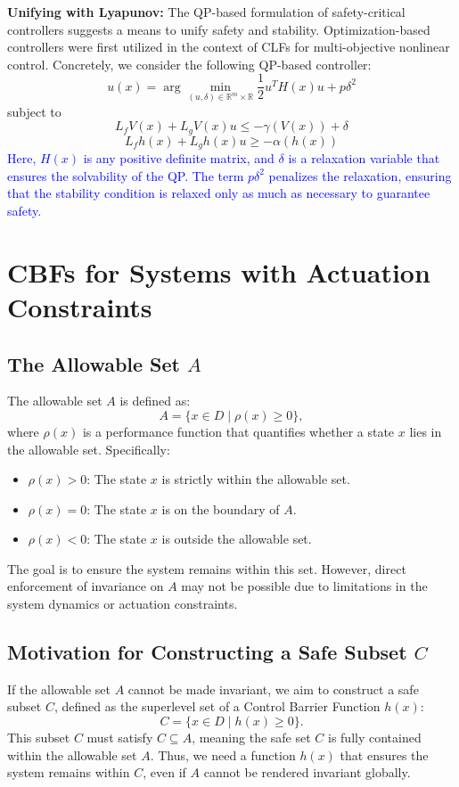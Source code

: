 \documentclass[12pt]{article}
\begin{document}
\textbf{Unifying with Lyapunov:}
The QP-based formulation of safety-critical controllers suggests a means to unify safety and stability. Optimization-based controllers were first utilized in the context of CLFs for multi-objective nonlinear control. Concretely, we consider the following QP-based controller:
\[
u(x) = \arg\min_{(u, \delta) \in \mathbb{R}^m \times \mathbb{R}} \frac{1}{2} u^T H(x) u + p \delta^2
\]
subject to
\[
L_f V(x) + L_g V(x) u \leq -\gamma(V(x)) + \delta
\]
\[
L_f h(x) + L_g h(x) u \geq -\alpha(h(x))
\]
\textcolor{blue}{
Here, \( H(x) \) is any positive definite matrix, and \( \delta \) is a relaxation variable that ensures the solvability of the QP. The term \( p \delta^2 \) penalizes the relaxation, ensuring that the stability condition is relaxed only as much as necessary to guarantee safety.
}

\section{CBFs for Systems with Actuation Constraints}
\subsection{The Allowable Set \( A \)}
The allowable set \( A \) is defined as:
\[
A = \{ x \in D \mid \rho(x) \geq 0 \},
\]
where \( \rho(x) \) is a performance function that quantifies whether a state \( x \) lies in the allowable set. Specifically:
\begin{itemize}
    \item \( \rho(x) > 0 \): The state \( x \) is strictly within the allowable set.
    \item \( \rho(x) = 0 \): The state \( x \) is on the boundary of \( A \).
    \item \( \rho(x) < 0 \): The state \( x \) is outside the allowable set.
\end{itemize}
The goal is to ensure the system remains within this set. However, direct enforcement of invariance on \( A \) may not be possible due to limitations in the system dynamics or actuation constraints.

\subsection{Motivation for Constructing a Safe Subset \( C \)}
If the allowable set \( A \) cannot be made invariant, we aim to construct a safe subset \( C \), defined as the superlevel set of a Control Barrier Function \( h(x) \):
\[
C = \{ x \in D \mid h(x) \geq 0 \}.
\]
This subset \( C \) must satisfy \( C \subseteq A \), meaning the safe set \( C \) is fully contained within the allowable set \( A \). Thus, we need a function \( h(x) \) that ensures the system remains within \( C \), even if \( A \) cannot be rendered invariant globally.
\end{document}
